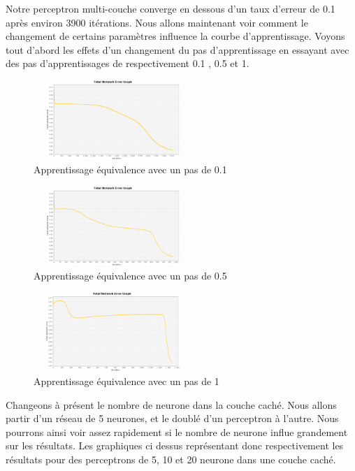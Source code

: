 \documentclass[twoside,openright,a4paper,11pt,french]{article}
\begin{document}
Notre perceptron multi-couche converge en dessous d'un taux d'erreur de 0.1
après environ 3900 itérations.
Nous allons maintenant voir comment le changement de certains paramètres
influence la courbe d'apprentissage. Voyons tout d'abord les effets d'un
changement du pas d'apprentissage en essayant avec des pas d'apprentissages de
respectivement 0.1 , 0.5 et 1.

\begin{figure}[ht]
\centering
\includegraphics[width=6cm,height=3cm]{./pics/eq/multi_eq_0.1.eps}
\caption{Apprentissage équivalence avec un pas de 0.1}
\end{figure}

\begin{figure}[ht]
\centering
\includegraphics[width=6cm,height=3cm]{./pics/eq/multi_eq_0.5.eps}
\caption{Apprentissage équivalence avec un pas de 0.5}
\end{figure}

\begin{figure}[ht]
\centering
\includegraphics[width=6cm,height=3cm]{./pics/eq/multi_eq_1.eps}
\caption{Apprentissage équivalence avec un pas de 1}
\end{figure}

Changeons à présent le nombre de neurone dans la couche caché.
Nous allons partir d'un réseau de 5 neurones, et le doublé d'un perceptron
à l'autre. Nous pourrons ainsi voir assez rapidement si le nombre de neurone
influe grandement sur les résultats.
Les graphiques ci dessus représentant donc respectivement les résultats pour
des perceptrons de 5, 10 et 20 neurone dans une couche caché.
\end{document}
